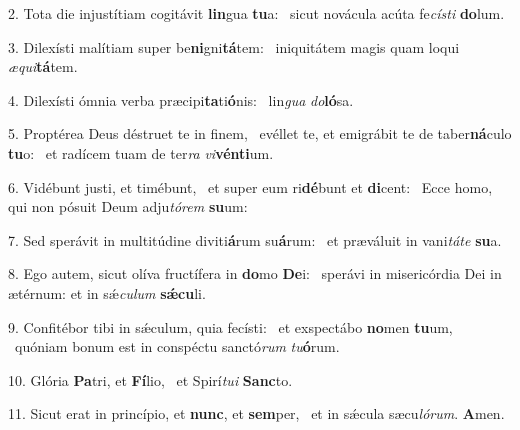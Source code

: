 2. Tota die injustítiam cogitávit \textbf{lin}gua \textbf{tu}a: \ast\  sicut novácula acúta fe\textit{cís}\textit{ti} \textbf{do}lum.\

3. Dilexísti malítiam super be\textbf{ni}gni\textbf{tá}tem: \ast\  iniquitátem magis quam loqui \textit{æ}\textit{qui}\textbf{tá}tem.\

4. Dilexísti ómnia verba præcipi\textbf{ta}ti\textbf{ó}nis: \ast\  lin\textit{gua} \textit{do}\textbf{ló}sa.\

5. Proptérea Deus déstruet te in finem, \dag\  evéllet te, et emigrábit te de taber\textbf{ná}culo \textbf{tu}o: \ast\  et radícem tuam de ter\textit{ra} \textit{vi}\textbf{vén}\textbf{ti}um.\

6. Vidébunt justi, et timébunt, \dag\  et super eum ri\textbf{dé}bunt et \textbf{di}cent: \ast\  Ecce homo, qui non pósuit Deum adju\textit{tó}\textit{rem} \textbf{su}um:\

7. Sed sperávit in multitúdine diviti\textbf{á}rum su\textbf{á}rum: \ast\  et præváluit in vani\textit{tá}\textit{te} \textbf{su}a.\

8. Ego autem, sicut olíva fructífera in \textbf{do}mo \textbf{De}i: \ast\  sperávi in misericórdia Dei in ætérnum: et in sǽ\textit{cu}\textit{lum} \textbf{sǽ}\textbf{cu}li.\

9. Confitébor tibi in sǽculum, quia fecísti: \dag\  et exspectábo \textbf{no}men \textbf{tu}um, \ast\  quóniam bonum est in conspéctu sanctó\textit{rum} \textit{tu}\textbf{ó}rum.\

10. Glória \textbf{Pa}tri, et \textbf{Fí}lio, \ast\  et Spirí\textit{tu}\textit{i} \textbf{Sanc}to.\

11. Sicut erat in princípio, et \textbf{nunc}, et \textbf{sem}per, \ast\  et in sǽcula sæcu\textit{ló}\textit{rum}. \textbf{A}men.\

